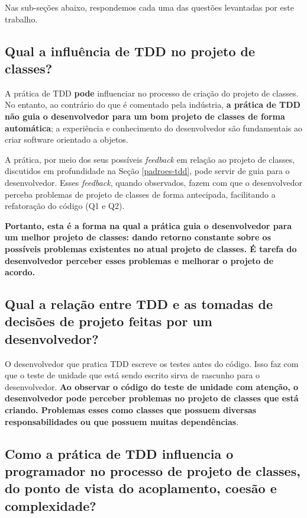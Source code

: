 \documentclass[conference]{IEEEtran}
\begin{document}
Nas sub-seções abaixo, respondemos cada uma das questões levantadas
por este trabalho.

\subsection{Qual a influência de TDD no projeto de classes?}

A prática de TDD \textbf{pode} influenciar no processo de criação do projeto de classes.
No entanto, ao contrário do que é comentado pela indústria,
\textbf{a prática de TDD não guia o desenvolvedor para um bom projeto de classes
de forma automática}; a experiência e conhecimento 
do desenvolvedor são fundamentais ao criar software orientado a objetos.

A prática, por meio dos seus possíveis \textit{feedback} em relação ao
projeto de classes, discutidos
em profundidade na Seção \ref{padroes-tdd}, pode servir de guia
para o desenvolvedor. Esses \textit{feedback}, quando observados, fazem
com que o desenvolvedor perceba problemas de projeto de classes de
forma antecipada, facilitando a refatoração do código (Q1 e Q2).

\textbf{Portanto, esta é a forma na qual a prática guia o desenvolvedor para
um melhor projeto de classes: dando retorno constante sobre os possíveis problemas
existentes no atual projeto de classes. É tarefa do desenvolvedor perceber
esses problemas e melhorar o projeto de acordo.}

\subsection{Qual a relação entre TDD e as tomadas de decisões de projeto
feitas por um desenvolvedor?}

O desenvolvedor que pratica TDD escreve os testes antes do código.
Isso faz com que o teste de unidade que está sendo escrito sirva de
rascunho para o desenvolvedor. \textbf{Ao observar o código do teste de unidade com atenção,
o desenvolvedor pode perceber problemas no projeto de classes que está criando.
Problemas esses como classes que possuem diversas responsabilidades
ou que possuem muitas dependências}. 

\subsection{Como a prática de TDD influencia o programador no processo de  
projeto de classes, do ponto de vista do acoplamento, coesão e complexidade?}
\end{document}
